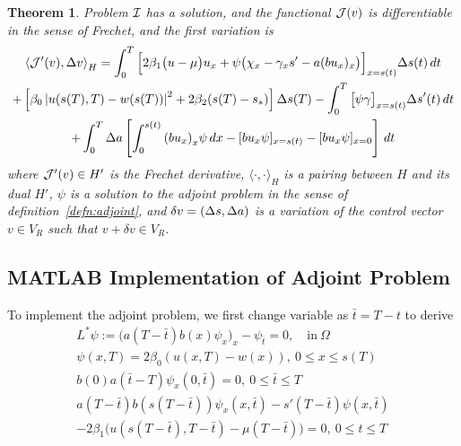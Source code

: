 \documentclass[letterpaper, 10pt]{amsart}
\newtheorem{theorem}{Theorem}
\theoremstyle{definition}
\theoremstyle{remark}
\newcommand{\lnorm}[1]{\left\vert #1\right\vert}%
\begin{document}
\begin{theorem}\label{thm:gradient-result}
  Problem $\mathcal{I}$ has a solution, and the functional $\mathcal{J}(v)$ is differentiable in the sense of Frechet, and the first variation is
  \begin{gather}
    \left\langle \J'(v),\Delta v \right\rangle_H
    = \int_0^T \Big[2\beta_1\big(u - \mu\big)u_x + \psi \big(\chi_x - \gamma_x s'  - a (b u_x)_x \big)\Big]_{x=s(t)} {\Delta s}(t)\,dt \nonumber
    \\
    +
    \left[\beta_0\lnorm{u(s(T),T) - w(s(T))}^2 + 2 \beta_2 (s(T) - s_*)\right] {\Delta s}(T) 
    - \int_0^T \big[\psi \gamma\big]_{x=s(t)} {\Delta s}'(t) \,dt \nonumber
    \\
    +\int_0^T {\Delta a} \left[ \int_0^{s(t)} {(b u_x)}_x \psi \,dx - [b u_x\psi]_{x=s(t)} - [b u_x \psi]_{x=0}\right] \,dt\label{eq:gradient-full}
  \end{gather}
  where $\mathcal{J}'(v) \in H'$ is the Frechet derivative, $\langle \cdot,\cdot \rangle_H$ is a pairing between $H$ and its dual $H'$, $\psi$ is a solution to the adjoint problem in the sense of definition~\ref{defn:adjoint}, and $\delta v = ({\Delta s}, {\Delta a}{})$ is a variation of the control vector $v \in V_R$ such that $v + \delta v \in V_R$.
\end{theorem}

\subsection{MATLAB Implementation of Adjoint Problem}

To implement the adjoint problem, we first change variable as $\bar{t} = T-t$ to derive
\begin{gather}
  L^{*} \psi := \big(a(T-\bar{t}) b(x) \psi_x\big)_x - \psi_{\bar{t}} = 0,\quad\text{in}~\Omega
  \\
  \psi(x, T) = 2\beta_0(u(x, T) - w(x)),~0 \leq x \leq s(T)
  \\
  b(0)a(\bar{t}-T)\psi_x(0, \bar{t}) =0,~0 \leq \bar{t} \leq T
  \\
  a(T-\bar{t}) b(s(T-\bar{t})) \psi_x(x,\bar{t})
  - s'(T-\bar{t})\psi(x,\bar{t})
  \\
  - 2\beta_1\big(
  u(s(T-\bar{t}),T-\bar{t}) - \mu(T-\bar{t})\big)=0, ~0 \leq t \leq T
\end{gather}
\end{document}
